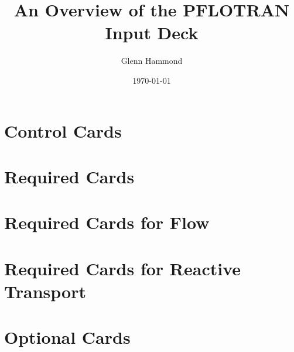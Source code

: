 \documentclass{beamer}
\title{An Overview of the PFLOTRAN Input Deck}
\author{Glenn Hammond}
\date{\today}
\begin{document}
\frame{\titlepage}

\begin{frame}
\footnotesize
\tableofcontents[]
\end{frame}



\section{Control Cards}


\section{Required Cards}







\section{Required Cards for Flow}


\section{Required Cards for Reactive Transport}




\section{Optional Cards}



\end{document}
